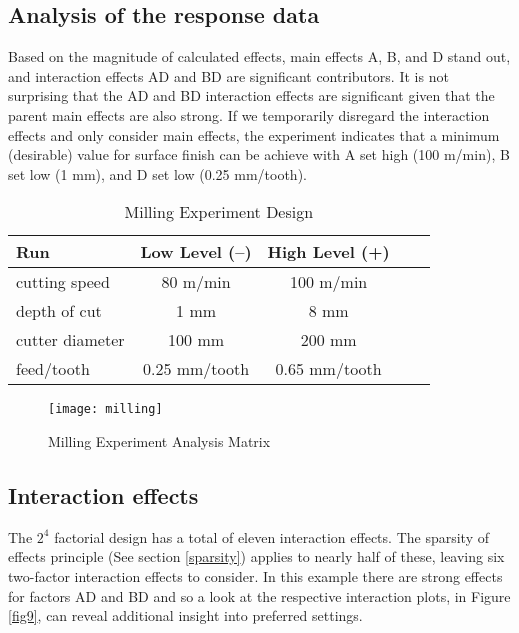 \subsection{Analysis of the response data}
Based on the magnitude of calculated effects, main effects A, B, and D stand out, and interaction effects AD and BD are significant contributors.  It is not surprising that the AD and BD interaction effects are significant given that the parent main effects are also strong. If we temporarily disregard the interaction effects and only consider main effects, the experiment indicates that a minimum (desirable) value for surface finish can be achieve with A set high (100 m/min), B set low (1 mm), and D set low (0.25 mm/tooth).\label{maineff}

\begin{table}[h]\caption{Milling Experiment Design}\label{tab8}
\begin{center}
\begin{tabular}{|l|c|c|c|c|}
\hline Run & Low Level (--) & High Level (+)  \\ 
\hline cutting speed & 80 m/min & 100 m/min  \\
\hline depth of cut & 1 mm & 8 mm \\
\hline cutter diameter & 100 mm & 200 mm\\
\hline feed/tooth & 0.25 mm/tooth & 0.65 mm/tooth \\
\hline
\end{tabular} 
\end{center}
\end{table}

\begin{sidewaysfigure}[h]\caption{Milling Experiment Analysis Matrix}\label{fig8}
\begin{center}

\texttt{[image: milling]}

\end{center}
\end{sidewaysfigure}

\subsection{Interaction effects}
The $2^{4}$ factorial design has a total of eleven interaction effects.  The sparsity of effects principle (See section \ref{sparsity}) applies to nearly half of these, leaving six two-factor interaction effects to consider.  In this example there are strong effects for factors AD and BD and so a look at the respective interaction plots, in Figure \ref{fig9}, can reveal additional insight into preferred settings.

